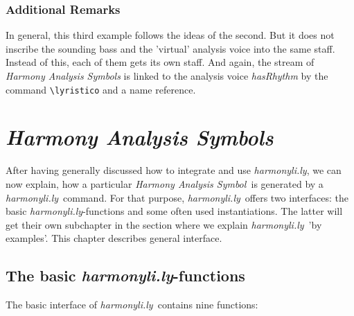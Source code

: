 \documentclass[
  DIV=calc,
  BCOR=5mm,
  12pt,
  headings=small,
  oneside,
  abstract=true,
  toc=bib,
  xcolor=dvipsnames,
  openany,
  ngerman,english]{scrartcl}
\newcommand{\acc}[0]{\textit}
\newcommand{\hlyn}[0]{\textit{harmonyli.ly}}
\newcommand{\has}[1]{\textit{Harmony Analysis Symbol#1}}
\begin{document}
\subsubsection{Additional Remarks}

In general, this third example follows the ideas of the second. But it does not
inscribe the sounding bass and the 'virtual' analysis voice into the same staff.
Instead of this, each of them gets its own staff. And again, the stream of
\has{s} is linked to the analysis voice \acc{hasRhythm} by the command
\texttt{\textbackslash lyristico} and a name reference.

\section{\has{s}}

After having generally discussed how to integrate and use \hlyn, we can now
explain, how a particular \has\ is generated by a \hlyn\ command. For that
purpose, \hlyn\ offers two interfaces: the basic \hlyn-functions and some
often used instantiations. The latter will get their own subchapter in the section
where we explain \hlyn\ 'by examples'. This chapter describes general interface. 

\subsection{The basic \hlyn-functions}
The basic interface of \hlyn\ contains nine functions:
\end{document}
